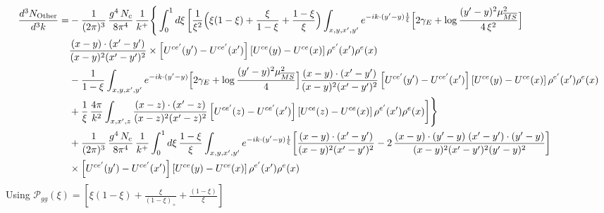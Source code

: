 \documentclass[9pt]{article}
\numberwithin{equation}{section}
\begin{document}
\begin{align}
\frac{d^{3}N_{\rm Other}}{d^{3}k}= &-\frac{1}{(2\pi)^{3}}\,\frac{g^{4}\,N_{c}}{8\pi^{4}}\,\frac{1}{k^{+}}\Bigg\{\int_{0}^{1}d\xi\,\bigg[\frac{1}{\xi^{2}}\Big(\xi(1-\xi)+\frac{\xi}{1-\xi}+\frac{1-\xi}{\xi}\Big)\int_{x,y,x',y'}e^{-ik\cdot(y'-y)\frac{1}{\xi}}\Big[2\gamma_{E}+\log\frac{(y'-y)^{2}\mu^{2}_{\overline{MS}}}{4\,\xi^{2}}\Big]\notag \\ & \frac{(x-y)\cdot(x'-y')}{(x-y)^{2}(x'-y')^{2}}\times\left[U^{ce'}(y') - U^{ce'}(x')\right]\left[U^{ce}(y) - U^{ce}(x)\right]\rho^{e'}(x')\rho^{e}(x)\notag\\
&-\frac{1}{1-\xi}\int_{x,y,x',y'}e^{-ik\cdot(y'-y)}\Big[2\gamma_{E}+\log\frac{(y'-y)^{2}\mu^{2}_{\overline{MS}}}{4}\Big]\frac{(x-y)\cdot(x'-y')}{(x-y)^{2}(x'-y')^{2}}\left[U^{ce'}(y') - U^{ce'}(x')\right]\left[U^{ce}(y) - U^{ce}(x)\right]\rho^{e'}(x')\rho^{e}(x)\notag\\
&+\frac{1}{\xi}\,\frac{4\pi}{k^{2}}\int_{x,x',z}\frac{(x-z)\cdot(x'-z)}{(x-z)^{2}(x'-z)^{2}}\left[U^{ce'}(z) - U^{ce'}(x')\right]\left[U^{ce}(z) - U^{ce}(x)\right]\rho^{e'}(x')\rho^{e}(x)\bigg]\Bigg\}\notag\\
&+\frac{1}{(2\pi)^{3}}\,\frac{g^{4}\,N_{c}}{8\pi^{4}}\,\frac{1}{k^{+}}\int_{0}^{1}d\xi\,\frac{1-\xi}{\xi}\int_{x,y,x',y'}e^{-ik\cdot(y'-y)\frac{1}{\xi}}\bigg[\frac{(x-y)\cdot(x'-y')}{(x-y)^{2}(x'-y')^{2}}-2\,\frac{(x-y)\cdot(y'-y)\;(x'-y')\cdot(y'-y)}{(x-y)^{2}(x'-y')^{2}(y'-y)^{2}}\bigg]\notag\\
&\times\left[U^{ce'}(y') - U^{ce'}(x')\right]\left[U^{ce}(y) - U^{ce}(x)\right]\rho^{e'}(x')\rho^{e}(x)
\end{align}
Using $\mathcal P_{gg}(\xi) = \left[\xi(1-\xi) + \frac{\xi}{(1-\xi)_{+}} + \frac{(1-\xi)}{\xi}\right]$
\end{document}
